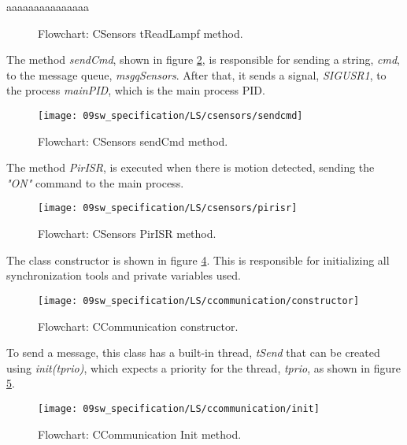 aaaaaaaaaaaaaaa

\begin{figure}[H]
	\centering
	\caption{Flowchart: CSensors tReadLampf method.}
	\label{fig:CSensorstreadlampf}
\end{figure}

The method \textit{sendCmd}, shown in figure \ref{fig:CSensorssendcmd}, is responsible for sending a string, \textit{cmd}, to the message queue, \textit{msgqSensors}. After that, it sends a signal, \textit{SIGUSR1}, to the process \textit{mainPID}, which is the main process PID.

\begin{figure}[H]
	\centering
	\texttt{[image: 09sw\_specification/LS/csensors/sendcmd]}
	\caption{Flowchart: CSensors sendCmd method.}
	\label{fig:CSensorssendcmd}
\end{figure}

The method \textit{PirISR}, is executed when there is motion detected, sending the \textit{"ON"} command to the main process.

\begin{figure}[H]
	\centering
	\texttt{[image: 09sw\_specification/LS/csensors/pirisr]}
	\caption{Flowchart: CSensors PirISR method.}
	\label{fig:CSensorspirisr}
\end{figure}

\clearpage
{}

The class constructor is shown in figure \ref{fig:CCommunicationConstructor}. This is responsible for initializing all synchronization tools and private variables used.

\begin{figure}[H]
	\centering
	\texttt{[image: 09sw\_specification/LS/ccommunication/constructor]}
	\caption{Flowchart: CCommunication constructor.}
	\label{fig:CCommunicationConstructor}
\end{figure}

To send a message, this class has a built-in thread, \textit{tSend} that can be created using \textit{init(tprio)}, which expects a priority for the thread, \textit{tprio}, as shown in figure \ref{fig:CCommunicationinit}.

\begin{figure}[H]
	\centering
	\texttt{[image: 09sw\_specification/LS/ccommunication/init]}
	\caption{Flowchart: CCommunication Init method.}
	\label{fig:CCommunicationinit}
\end{figure}


